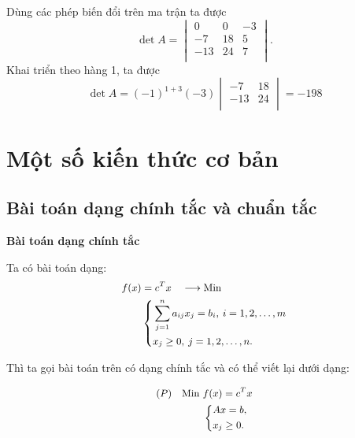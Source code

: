 \documentclass[12pt,a4paper]{report}
\begin{document}
Dùng các phép biến đổi trên ma trận ta được
\begin{equation*}
    \det A =
    \begin{vmatrix}
        0 & 0 & -3 \\
        -7 & 18 & 5 \\
        -13 & 24 & 7 \\
    \end{vmatrix}.
\end{equation*}
Khai triển theo hàng 1, ta được
\begin{equation*}
    \det A = (-1)^{1+3}(-3)
    \begin{vmatrix}
        -7 & 18 \\
        -13 & 24 \\
    \end{vmatrix}
    = -198
\end{equation*}


\section{Một số kiến thức cơ bản}

\subsection{Bài toán dạng chính tắc và chuẩn tắc}

     \textbf{Bài toán dạng chính tắc}
    
    Ta có bài toán dạng:
    \begin{equation} \small \label{F}
        \begin{split}
        f(x) & = c^Tx \quad \longrightarrow \text{Min} \\
            & \left\{
            \begin{split}
            & \sum _{j=1}^n a_{ij} x_j = b_i, \: i=1,2,\ldots,m \\
            & x_j \geq 0, \: j=1,2,\ldots,n.
            \end{split}
            \right.    
        \end{split}
    \end{equation}

    Thì ta gọi bài toán trên có dạng chính tắc và có thể viết lại dưới dạng:

    \begin{equation} \small \label{chinhtac}
        \begin{split}
        (P) \quad \text{Min } & f(x) = c^Tx \\
            & \left\{
            \begin{split}
            & Ax=b, \\
            & x_j \geq 0.
            \end{split}
            \right.    
        \end{split}
    \end{equation}
\end{document}
